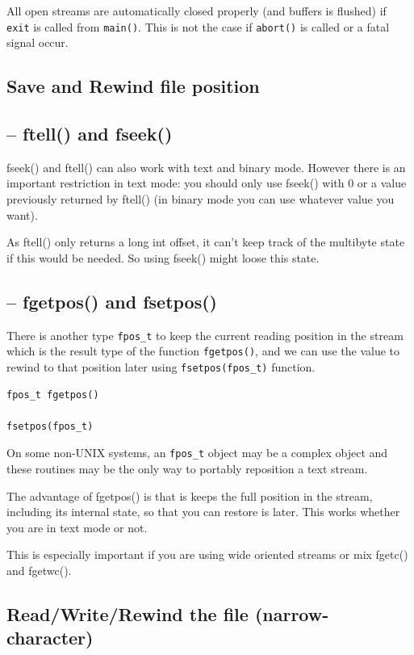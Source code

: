 All open streams are automatically closed properly (and buffers is flushed) if
\verb!exit! is called from \verb!main()!. This is not the case if \verb!abort()!
is called or a fatal signal occur.

\subsection{Save and Rewind file position}

\subsection{-- ftell() and fseek()}


fseek() and ftell() can also work with text and binary mode. However there is an
important restriction in text mode: you should only use fseek() with 0 or a
value previously returned by ftell() (in binary mode you can use whatever value
you want).

As ftell() only returns a long int offset, it can't keep track of the multibyte
state if this would be needed. So using fseek() might loose this state.


\subsection{-- fgetpos() and fsetpos()}

There is another type \verb!fpos_t! to keep the current reading position in the
stream which is the result type of the function \verb!fgetpos()!, and we can use
the value to rewind to that position later using \verb!fsetpos(fpos_t)!
function.

\begin{verbatim}
fpos_t fgetpos()

fsetpos(fpos_t)
\end{verbatim}

On some non-UNIX systems, an \verb!fpos_t! object may be a complex object and
these routines may be the only way to portably reposition a text stream.

The advantage of fgetpos() is that is keeps the full position in the stream,
including its internal state, so that you can restore is later. This works
whether you are in text mode or not.

This is especially important if you are using wide oriented streams or mix
fgetc() and fgetwc().

\subsection{Read/Write/Rewind the file (narrow-character)}
\label{sec:FILE_with-lock}

